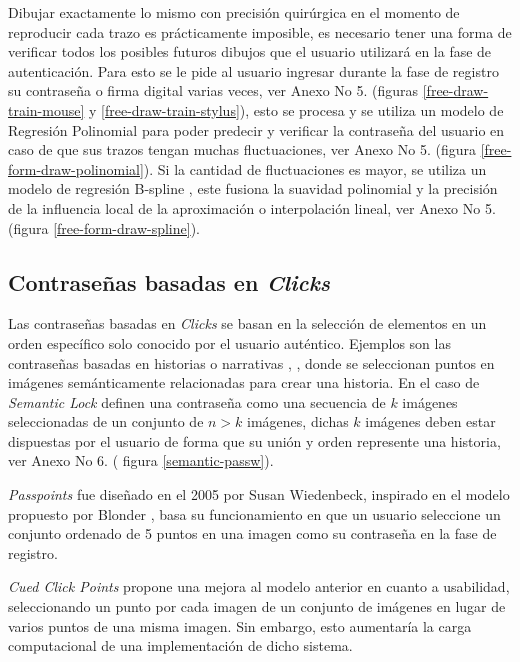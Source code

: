 Dibujar exactamente lo mismo con precisión quirúrgica en el momento de reproducir cada trazo es prácticamente imposible, es necesario tener una forma de verificar todos los posibles futuros dibujos que el usuario utilizará en la fase de autenticación. 
Para esto se le pide al usuario ingresar durante la fase de registro su contraseña o firma digital varias veces, ver Anexo No 5. (figuras \ref{free-draw-train-mouse} y \ref{free-draw-train-stylus}), esto se procesa y se utiliza un modelo de Regresión Polinomial \cite{heiberger2009polynomial} para poder predecir y verificar la contraseña del usuario en caso de que sus trazos tengan muchas fluctuaciones, ver Anexo No 5. (figura \ref{free-form-draw-polinomial}).  Si la cantidad de fluctuaciones es mayor, se utiliza un modelo de regresión B-spline \cite{imoto2000b}, este fusiona la suavidad polinomial y la precisión de la influencia local de la aproximación o interpolación lineal, ver Anexo No 5. (figura \ref{free-form-draw-spline}).





\subsection{Contraseñas basadas en \textit{Clicks}}
Las contraseñas basadas en \textit{Clicks} se basan en la selección de elementos en un orden específico solo conocido por el usuario auténtico. 
Ejemplos son las contraseñas basadas en historias o narrativas \cite{olade2023story}, \cite{hoover2015narrative}, donde se seleccionan puntos en imágenes semánticamente relacionadas para crear una historia. En el caso de  \textit{Semantic Lock} \cite{olade2023story} definen una contraseña como una secuencia de $k$ imágenes seleccionadas de un conjunto de $n > k$ imágenes, dichas $k$ imágenes deben estar dispuestas por el usuario de forma que su unión y orden represente una historia, ver Anexo No 6. ( figura \ref{semantic-passw}).

\textit{Passpoints} \cite{wiedenbeck2005passpoints} fue diseñado en el 2005 por Susan Wiedenbeck, inspirado en el modelo propuesto por Blonder \cite{blonder1996graphical}, basa su funcionamiento en que un usuario seleccione un conjunto ordenado de 5 puntos en una imagen como su contraseña en la fase de registro.

\textit{Cued Click Points} \cite{chiasson2007graphical} propone una mejora al modelo anterior en cuanto a usabilidad, seleccionando un punto por cada imagen de un conjunto de imágenes en lugar de varios puntos de una misma imagen. Sin embargo, esto aumentaría la carga computacional de una implementación de dicho sistema.

